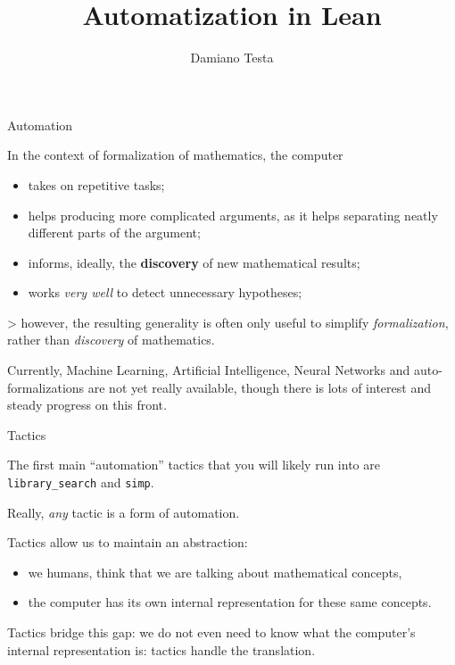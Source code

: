 \documentclass{beamer}
\title{Automatization in Lean}
\author{Damiano Testa}
\institute{University of Warwick}
\date{May 2nd, 2023\\
\vspace{50pt}
RNTA mini symposium

\href{http://www.rnta.eu/7MSRNTA/lean.html}{Atelier Lean 2023}}
\begin{document}
\frame{\titlepage}

\begin{frame}[fragile]
{Automation}

In the context of formalization of mathematics, the computer

\begin{itemize}
\item
  takes on repetitive tasks;
\item
  helps producing more complicated arguments, as it helps separating neatly different parts of the argument;
\item
  informs, ideally, the {\textbf{discovery}} of new mathematical results;
\item
  works {\emph{very well}} to detect unnecessary hypotheses;
\end{itemize}

  > however, the resulting generality is often only useful to simplify {\emph{formalization}}, rather than {\emph{discovery}} of mathematics.


Currently, Machine Learning, Artificial Intelligence, Neural Networks and auto-formalizations are not yet really available, though there is lots of interest and steady progress on this front.
\end{frame}

\begin{frame}[fragile]{Tactics}

The first main ``automation'' tactics that you will likely run into are {\verb`library_search`} and {\verb`simp`}.

Really, {\emph{any}} tactic is a form of automation.

Tactics allow us to maintain an abstraction:

\begin{itemize}
\item
  we humans, think that we are talking about mathematical concepts,
\item
  the computer has its own internal representation for these same concepts.
\end{itemize}

Tactics bridge this gap: we do not even need to know what the computer's internal representation is: tactics handle the translation.
\end{frame}
\end{document}
